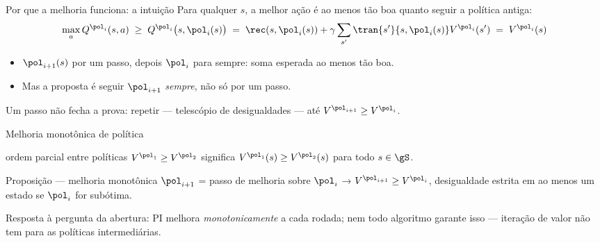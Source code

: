 \documentclass[aspectratio=169, 11pt]{beamer}
\begin{document}
\begin{frame}{Por que a melhoria funciona: a intuição}
  Para qualquer $s$, a melhor ação é ao menos tão boa quanto seguir a política antiga:
  \[
    \max_{a} Q^{\pol_i}(s,a) \;\ge\; Q^{\pol_i}\bigl(s, \pol_i(s)\bigr)
    \;=\; \rec(s,\pol_i(s)) + \gamma \sum_{s'} \tran{s'}{s,\pol_i(s)} V^{\pol_i}(s')
    \;=\; V^{\pol_i}(s)
  \]
  \begin{itemize}\setlength{\itemsep}{0.3ex}
    \item $\pol_{i+1}(s)$ \alert{por um passo}, depois $\pol_i$ para sempre: soma
          esperada ao menos tão boa.
    \item \alert{Mas} a proposta é seguir $\pol_{i+1}$ \emph{sempre}, não só por um
          passo.
  \end{itemize}
  \begin{alertabox}
    Um passo não fecha a prova: repetir --- telescópio de desigualdades --- até
    $V^{\pol_{i+1}} \ge V^{\pol_i}$.
  \end{alertabox}
\end{frame}

\begin{frame}{Melhoria monotônica de política}
  \begin{defbox}[fontupper=\small]{ordem parcial entre políticas}
    $V^{\pol_1} \ge V^{\pol_2}$ significa $V^{\pol_1}(s) \ge V^{\pol_2}(s)$
    para \alert{todo} $s \in \gS$.
  \end{defbox}
  \begin{teobox}{Proposição --- melhoria monotônica}
    $\pol_{i+1}$ = passo de melhoria sobre $\pol_i$ → $V^{\pol_{i+1}} \ge V^{\pol_i}$,
    desigualdade \alert{estrita} em ao menos um estado se $\pol_i$ for subótima.
  \end{teobox}
  \begin{ideiabox}
    Resposta à pergunta da abertura: PI melhora \emph{monotonicamente} a cada rodada;
    nem todo algoritmo garante isso --- iteração de valor não tem para as políticas
    intermediárias.
  \end{ideiabox}
\end{frame}
\end{document}
